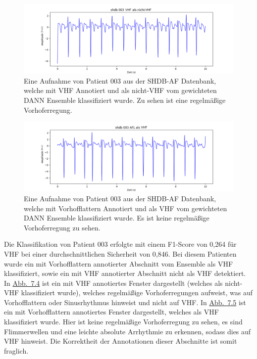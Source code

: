 \begin{figure}[!ht]%
\centering
	\includegraphics[width=1\textwidth]{./Bilder/003_vhf.png}
\caption[SHDB-AF Aufnahme von Patient 003 mit AFIB Annotation]{Eine Aufnahme von Patient 003 aus der SHDB-AF Datenbank, welche mit \gls{VHF} Annotiert und als nicht-\gls{VHF} vom gewichteten \gls{DANN} Ensemble klassifiziert wurde. Zu sehen ist eine regelmäßige Vorhoferregung.} 
\label{fig:shdb_003_vhf}
\end{figure} 

\begin{figure}[!ht]%
\centering
	\includegraphics[width=1\textwidth]{./Bilder/003_afl.png}
\caption[SHDB-AF Aufnahme von Patient 003 mit AFL Annotation]{Eine Aufnahme von Patient 003 aus der SHDB-AF Datenbank, welche mit Vorhofflattern Annotiert und als \gls{VHF} vom gewichteten \gls{DANN} Ensemble klassifiziert wurde. Es ist keine regelmäßige Vorhoferregung zu sehen.} 
\label{fig:shdb_003_afl}
\end{figure} 

Die Klassifikation von Patient 003 erfolgte mit einem F1-Score von 0,264 für \gls{VHF} bei einer durchschnittlichen Sicherheit von 0,846. Bei diesem Patienten wurde ein mit Vorhofflattern annotierter Abschnitt vom Ensemble als \gls{VHF} klassifiziert, sowie ein mit \gls{VHF} annotierter Abschnitt nicht als \gls{VHF} detektiert. In \hyperref[fig:shdb_003_vhf]{Abb.~7.4} ist ein mit \gls{VHF} annotiertes Fenster dargestellt (welches als nicht-\gls{VHF} klassifiziert wurde), welches regelmäßige Vorhoferregungen aufweist, was auf Vorhofflattern oder Sinusrhythmus hinweist und nicht auf \gls{VHF}. In \hyperref[fig:shdb_003_afl]{Abb.~7.5} ist ein mit Vorhofflattern annotiertes Fenster dargestellt, welches als \gls{VHF} klassifiziert wurde. Hier ist keine regelmäßige Vorhoferregung zu sehen, es sind Flimmerwellen und eine leichte absolute Arrhythmie zu erkennen, sodass dies auf \gls{VHF} hinweist. Die Korrektheit der Annotationen dieser Abschnitte ist somit fraglich.


